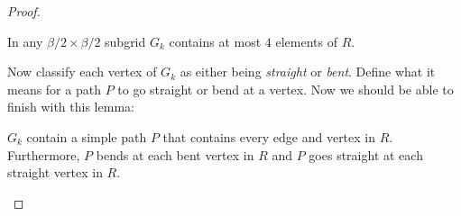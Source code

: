 \documentclass{patmorin}
\begin{document}
\begin{proof}
  \begin{cor}
      In any $\beta/2\times \beta/2$ subgrid $G_k$ contains at most $4$ elements of $R$.
  \end{cor}

    Now classify each vertex of $G_k$ as either being \emph{straight} or \emph{bent}. Define what it means for a path $P$ to go straight or bend at a vertex.  Now we should be able to finish with this lemma:

    \begin{lem}
        $G_k$ contain a simple path $P$ that contains every edge and vertex in $R$.  Furthermore, $P$ bends at each bent vertex in $R$ and $P$ goes straight at each straight vertex in $R$.
    \end{lem}
\end{proof}









\end{document}
